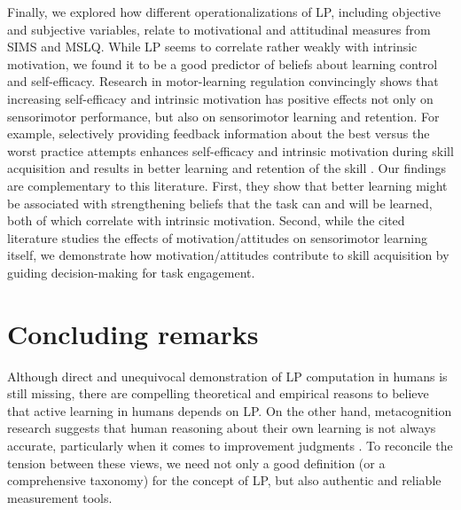 Finally, we explored how different operationalizations of \ac{LP}, including objective and subjective variables, relate to motivational and attitudinal measures from \ac{SIMS} and \ac{MSLQ}. While \ac{LP} seems to correlate rather weakly with intrinsic motivation, we found it to be a good predictor of beliefs about learning control and self-efficacy. Research in motor-learning regulation \parencite{wulf_optimizing_2016,lewthwaite_optimizing_2017} convincingly shows that increasing self-efficacy and intrinsic motivation has positive effects not only on sensorimotor performance, but also on sensorimotor learning and retention. For example, selectively providing feedback information about the best versus the worst practice attempts enhances self-efficacy and intrinsic motivation during skill acquisition and results in better learning and retention of the skill \parencite{abbas_good-vs_2018}. Our findings are complementary to this literature. First, they show that better learning might be associated with strengthening beliefs that the task can and will be learned, both of which correlate with intrinsic motivation. Second, while the cited literature studies the effects of motivation/attitudes on sensorimotor learning itself, we demonstrate how motivation/attitudes contribute to skill acquisition by guiding decision-making for task engagement.

\section{Concluding remarks}

Although direct and unequivocal demonstration of \ac{LP} computation in humans is still missing, there are compelling theoretical \parencite{son_metacognitive_2006,lopes_strategic_2012,gottlieb_information-seeking_2013} and empirical \parencite{metcalfe_region_2005,poli_infants_2020,ten_humans_2021,leonard_young_2021} reasons to believe that active learning in humans depends on \ac{LP}. On the other hand, metacognition research suggests that human reasoning about their own learning is not always accurate, particularly when it comes to improvement judgments \parencite{townsend_judgments_2011,townsend_metacognitive_2011}. To reconcile the tension between these views, we need not only a good definition (or a comprehensive taxonomy) for the concept of \ac{LP}, but also authentic and reliable measurement tools.

